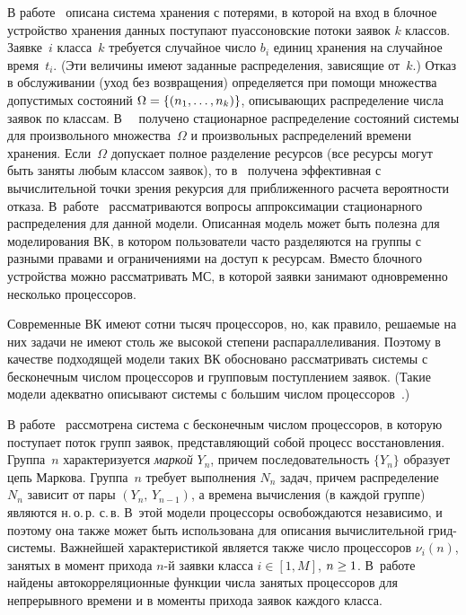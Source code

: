 \begin{multicols}{2}
В работе~\cite{kaufman81} описана система хранения с
потерями, в которой на вход в блочное устройство хранения данных
поступают пуассоновские потоки заявок $k$ классов. Заявке~$i$ класса~$k$ 
требуется случайное чис\-ло $b_i$ единиц хранения на случайное время~$t_i$. 
(Эти величины имеют  заданные распределения, зависящие от~$k$.) 
Отказ в обслуживании (уход без возвращения) определяется при
помощи множества допустимых состояний $\Omega\hm=\{(n_{1},\ldots,
n_{k})\}$, описывающих распределение  числа заявок по классам. 
В~~\cite{kaufman81}  получено стационарное распределение состояний
сис\-те\-мы для произвольного множества~$\Omega$ и произвольных
распределений  времени хранения. Если~$\Omega$ допускает полное
разделение ресурсов (все ресурсы могут быть заняты любым классом
заявок), то в~\cite{kaufman81} получена эффективная с
вычислительной точки зрения рекурсия для приближенного расчета
вероятности отказа. В~работе~\cite{whitt85} рассматриваются вопросы
аппроксимации стационарного распределения для данной модели.
Описанная модель может быть полезна для моделирования ВК, в котором
пользователи  часто разделяются на группы с разными правами и
ограничениями на доступ к ресурсам. Вместо блочного устройства можно
рассматривать МС, в которой заявки занимают одновременно несколько
процессоров.

Современные ВК имеют сотни тысяч процессоров, но, как правило,
решаемые на них задачи не имеют столь же высокой степени
распараллеливания. Поэтому в качестве подходящей модели таких ВК
обосновано рассматривать системы с бесконечным числом процессоров и
групповым поступлением заявок. (Такие  модели  адекватно описывают
системы  с большим числом процессоров~\cite{Borovkov, Kovalenko}.)

В работе~\cite{liu-templeton} рассмотрена система с бесконечным
чис\-лом процессоров, в которую поступает поток групп заявок,
 представляющий собой процесс восстановления. Группа~$n$ характеризуется  {\it
 маркой}
$Y_{n}$, причем последовательность $\{Y_{n}\}$ образует цепь
Маркова. Группа~$n$ требует выполнения $N_{n}$ задач, причем
распределение~$N_{n}$ зависит  от пары $(Y_{n},\, Y_{n-1})$, а
времена вычисления  (в каждой группе) являются н.\,о.\,р. с.\,в. В~этой
модели процессоры освобождаются независимо, и поэтому она также может
быть использована  для описания вычислительной грид-сис\-те\-мы.
Важнейшей характеристикой является также
 число процессоров $\nu_{i}(n)$, занятых в момент прихода $n$-й заявки
класса $i\in[1,M]$, $n\hm\ge 1$. В~работе~\cite{liu-templeton} найдены
автокорреляционные функции числа занятых процессоров для
непрерывного времени и  в моменты прихода заявок каждого класса.


\end{multicols}
